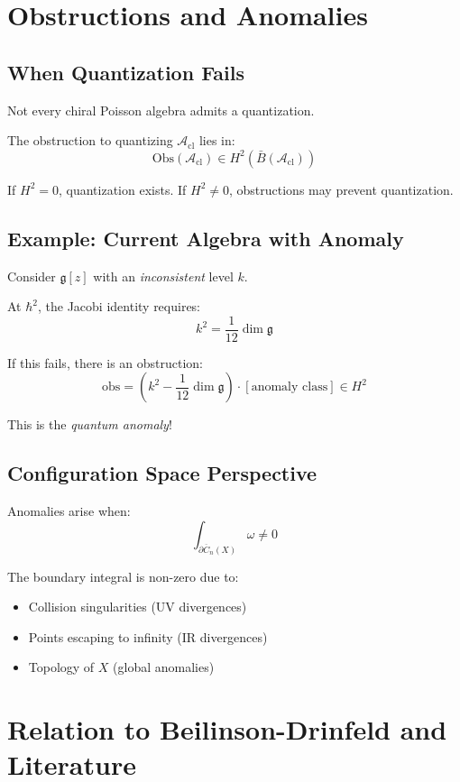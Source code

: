 \section{Obstructions and Anomalies}

\subsection{When Quantization Fails}

Not every chiral Poisson algebra admits a quantization.

\begin{theorem}
The obstruction to quantizing $\mathcal{A}_{\text{cl}}$ lies in:
$$\text{Obs}(\mathcal{A}_{\text{cl}}) \in H^2(\bar{B}(\mathcal{A}_{\text{cl}}))$$

If $H^2 = 0$, quantization exists. If $H^2 \neq 0$, obstructions may prevent quantization.
\end{theorem}

\subsection{Example: Current Algebra with Anomaly}

Consider $\mathfrak{g}[z]$ with an \emph{inconsistent} level $k$.

At $\hbar^2$, the Jacobi identity requires:
$$k^2 = \frac{1}{12} \dim \mathfrak{g}$$

If this fails, there is an obstruction:
$$\text{obs} = (k^2 - \frac{1}{12}\dim\mathfrak{g}) \cdot [\text{anomaly class}] \in H^2$$

This is the \emph{quantum anomaly}!

\subsection{Configuration Space Perspective}

Anomalies arise when:
$$\int_{\partial \overline{C}_n(X)} \omega \neq 0$$

The boundary integral is non-zero due to:
\begin{itemize}
\item Collision singularities (UV divergences)
\item Points escaping to infinity (IR divergences)
\item Topology of $X$ (global anomalies)
\end{itemize}

\section{Relation to Beilinson-Drinfeld and Literature}

